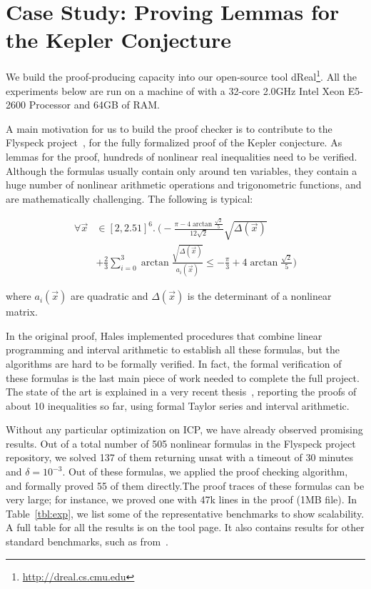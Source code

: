 \section{Case Study: Proving Lemmas for the Kepler Conjecture}\label{kepler}

We build the proof-producing capacity into our open-source tool {\sf
  dReal}\footnote{ \url{http://dreal.cs.cmu.edu} }. All the
experiments below are run on a machine of with a 32-core 2.0GHz Intel
Xeon E5-2600 Processor and 64GB of RAM.



A main motivation for us to build the proof checker is to contribute
to the Flyspeck project~\cite{DBLP:conf/dagstuhl/Hales05}, for the
fully formalized proof of the Kepler conjecture. As lemmas for the
proof, hundreds of nonlinear real inequalities need to be verified.
Although the formulas usually contain only around ten variables, they
contain a huge number of nonlinear arithmetic operations and
trigonometric functions, and are mathematically challenging. The
following is typical:

\begin{align*}
\forall \vec x&\in [2, 2.51]^6.\ \Big( -\frac{\pi-4\arctan\frac{\sqrt
2}{5}}{12\sqrt2}\sqrt{\Delta(\vec x)}\\
&+\frac{2}{3}\sum_{i=0}^3\arctan\frac{\sqrt{\Delta(\vec x)}}{a_i(\vec x)}\leq
-\frac{\pi}{3}+4\arctan\frac{\sqrt 2}{5}\Big)
\end{align*}

where $a_i(\vec x)$ are quadratic and $\Delta(\vec x)$ is the
determinant of a nonlinear matrix.

In the original proof, Hales implemented procedures that combine
linear programming and interval arithmetic to establish all these
formulas, but the algorithms are hard to be formally verified. In
fact, the formal verification of these formulas is the last main piece
of work needed to complete the full project. The state of the art is
explained in a very recent thesis~\cite{keplerthesis}, reporting the
proofs of about 10 inequalities so far, using formal Taylor series and
interval arithmetic.

Without any particular optimization on ICP, we have already observed
promising results. Out of a total number of 505 nonlinear formulas in
the Flyspeck project repository, we solved 137 of them returning {\sf
  unsat} with a timeout of 30 minutes and $\delta=10^{-3}$. Out of
these formulas, we applied the proof checking algorithm, and formally
proved 55 of them directly.The proof traces of these formulas can be
very large; for instance, we proved one with 47k lines in the proof
(1MB file). In Table~\ref{tbl:exp}, we list some of the representative
benchmarks to show scalability. A full table for all the results is on
the tool page. It also contains results for other standard benchmarks,
such as from~\cite{DBLP:conf/cade/JovanovicM12}.

